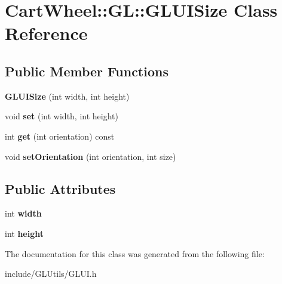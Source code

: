 \hypertarget{classCartWheel_1_1GL_1_1GLUISize}{
\section{CartWheel::GL::GLUISize Class Reference}
\label{classCartWheel_1_1GL_1_1GLUISize}
}
\subsection*{Public Member Functions}
\begin{DoxyCompactItemize}
\item 
\hypertarget{classCartWheel_1_1GL_1_1GLUISize_a443353ad82f0c7aee29d989bba9f6951}{
{\bfseries GLUISize} (int width, int height)}
\label{classCartWheel_1_1GL_1_1GLUISize_a443353ad82f0c7aee29d989bba9f6951}

\item 
\hypertarget{classCartWheel_1_1GL_1_1GLUISize_a04714a4dd684e9f064a9ca58fd632f3b}{
void {\bfseries set} (int width, int height)}
\label{classCartWheel_1_1GL_1_1GLUISize_a04714a4dd684e9f064a9ca58fd632f3b}

\item 
\hypertarget{classCartWheel_1_1GL_1_1GLUISize_a3f0bb1bb41f241d99094fa9f6dd84fd6}{
int {\bfseries get} (int orientation) const }
\label{classCartWheel_1_1GL_1_1GLUISize_a3f0bb1bb41f241d99094fa9f6dd84fd6}

\item 
\hypertarget{classCartWheel_1_1GL_1_1GLUISize_aa5740f11b1b3e6f1deeaa53cfff01316}{
void {\bfseries setOrientation} (int orientation, int size)}
\label{classCartWheel_1_1GL_1_1GLUISize_aa5740f11b1b3e6f1deeaa53cfff01316}

\end{DoxyCompactItemize}
\subsection*{Public Attributes}
\begin{DoxyCompactItemize}
\item 
\hypertarget{classCartWheel_1_1GL_1_1GLUISize_ac5dbcdb57532094f3e0a44f81bd816d8}{
int {\bfseries width}}
\label{classCartWheel_1_1GL_1_1GLUISize_ac5dbcdb57532094f3e0a44f81bd816d8}

\item 
\hypertarget{classCartWheel_1_1GL_1_1GLUISize_aaa929f101251facddcb156c912d7b9b0}{
int {\bfseries height}}
\label{classCartWheel_1_1GL_1_1GLUISize_aaa929f101251facddcb156c912d7b9b0}

\end{DoxyCompactItemize}


The documentation for this class was generated from the following file:\begin{DoxyCompactItemize}
\item 
include/GLUtils/GLUI.h\end{DoxyCompactItemize}
